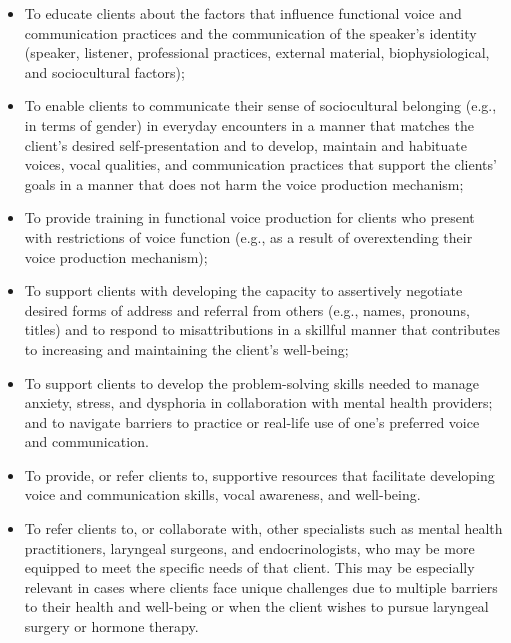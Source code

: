 \documentclass[
]{book}
\providecommand{\tightlist}{%
  \setlength{\itemsep}{0pt}\setlength{\parskip}{0pt}}
\begin{document}
\begin{itemize}
\tightlist
\item
  To educate clients about the factors that influence functional voice and communication practices and the communication of the speaker's identity (speaker, listener, professional practices, external material, biophysiological, and sociocultural factors);
\item
  To enable clients to communicate their sense of sociocultural belonging (e.g., in terms of gender) in everyday encounters in a manner that matches the client's desired self-presentation and to develop, maintain and habituate voices, vocal qualities, and communication practices that support the clients' goals in a manner that does not harm the voice production mechanism;
\item
  To provide training in functional voice production for clients who present with restrictions of voice function (e.g., as a result of overextending their voice production mechanism);
\item
  To support clients with developing the capacity to assertively negotiate desired forms of address and referral from others (e.g., names, pronouns, titles) and to respond to misattributions in a skillful manner that contributes to increasing and maintaining the client's well-being;
\item
  To support clients to develop the problem-solving skills needed to manage anxiety, stress, and dysphoria in collaboration with mental health providers; and to navigate barriers to practice or real-life use of one's preferred voice and communication.
\item
  To provide, or refer clients to, supportive resources that facilitate developing voice and communication skills, vocal awareness, and well-being.
\item
  To refer clients to, or collaborate with, other specialists such as mental health practitioners, laryngeal surgeons, and endocrinologists, who may be more equipped to meet the specific needs of that client. This may be especially relevant in cases where clients face unique challenges due to multiple barriers to their health and well-being or when the client wishes to pursue laryngeal surgery or hormone therapy.
\end{itemize}
\end{document}
